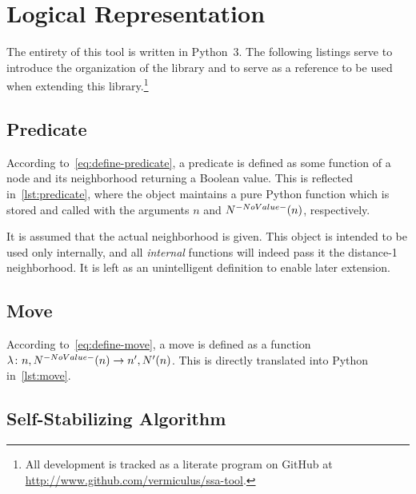 \section{Logical Representation}
\label{sec:logic-repr}

The entirety of this tool is written in Python~3.
The following listings serve to introduce the organization of the library and
  to serve as a reference to be used when extending this library.\footnote{%
    All development is tracked as a literate program on GitHub
    at \url{http://www.github.com/vermiculus/ssa-tool}.}

\subsection{Predicate}
\label{sec:logic-repr:predicate}

According to~\eqref{eq:define-predicate},
  a predicate is defined as some function of
  a node and its neighborhood returning a Boolean value.
This is reflected in~\autoref{lst:predicate},
  where the  object maintains a pure Python function
  which is stored and called with the arguments $n$ and $\OpenNeighborhood{n}$,
  respectively.
\begin{warning}
  It is assumed that the actual neighborhood is given.
  This object is intended to be used only internally,
    and all \emph{internal} functions will indeed pass it the distance-1 neighborhood.
  It is left as an unintelligent definition to enable later extension.
\end{warning}


\subsection{Move}
\label{sec:logic-repr:move}

According to~\eqref{eq:define-move},
  a move is defined as a function
  $\Function{n, \OpenNeighborhood{n}}{n^\prime, \OpenNeighborhood[\prime]{n}}$.
This is directly translated into Python in~\autoref{lst:move}.


\subsection{Self-Stabilizing Algorithm}
\label{sec:logic-repr:self-stab-algor}

